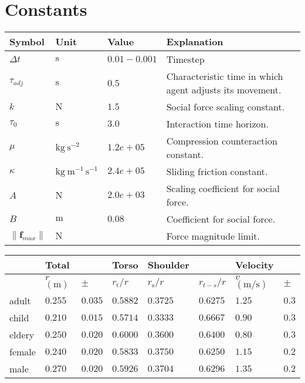 \section{Constants}


\begin{tabular*}{1.0\linewidth}{llll}
Symbol         & Unit & Value & Explanation \\
\hline
\hline
$ \Delta t $ & $ \mathrm{s} $ & $ 0.01-0.001 $ & Timestep \\
\hline
\hline
$ \tau_{adj} $ & $ \mathrm{s} $ & $ 0.5 $ & Characteristic time in which agent adjusts its movement. \\
$ k $          & $ \mathrm{N} $ & $ 1.5 $ & Social force scaling constant. \\
$ \tau_{0} $   & $ \mathrm{s} $ & $ 3.0 $ & Interaction time horizon. \\
$ \mu $        & $ \mathrm{kg \ s^{-2}} $ & $ 1.2e+05 $ & Compression counteraction constant. \\
$ \kappa $     & $ \mathrm{kg \ m^{-1}\,s^{-1}} $ & $ 2.4e+05 $ & Sliding friction constant. \\
$ A $          & $ \mathrm{N} $ & $ 2.0e+03 $ & Scaling coefficient for social force. \\
$ B $          & $ \mathrm{m} $ & $ 0.08 $ & Coefficient for social force. \\
\hline
\hline
$ \left\|\mathbf{f}_{max}\right\| $    & $ \mathrm{N} $ &  & Force magnitude limit. \\
\hline
\end{tabular*} 


\begin{tabular*}{1.0\linewidth}{llllllll}
& Total && Torso & Shoulder &  & Velocity &  \\
\hline
& $ r $ $ (\mathrm{m}) $ & $ \pm $ & $ r_{\text{t}} / r $ & $ r_{\text{s}} / r $ & $ r_{t-s} / r $ & $ v $ $ (\mathrm{m} / \mathrm{s}) $ & $ \pm $ \\
\hline\hline
adult & $ 0.255 $ & $ 0.035 $ & $ 0.5882 $ & $ 0.3725 $ & $ 0.6275 $ & $ 1.25 $ & $ 0.3 $ \\
child & $ 0.210 $ & $ 0.015 $ & $ 0.5714 $ & $ 0.3333 $ & $ 0.6667 $ & $ 0.90 $ & $ 0.3 $ \\
eldery & $ 0.250 $ & $ 0.020 $ & $ 0.6000 $ & $ 0.3600 $ & $ 0.6400 $ & $ 0.80 $ & $ 0.3 $ \\
female & $ 0.240 $ & $ 0.020 $ & $ 0.5833 $ & $ 0.3750 $ & $ 0.6250 $ & $ 1.15 $ & $ 0.2 $ \\
male & $ 0.270 $ & $ 0.020 $ & $ 0.5926 $ & $ 0.3704 $ & $ 0.6296 $ & $ 1.35 $ & $ 0.2 $ \\
\hline
\end{tabular*} 
